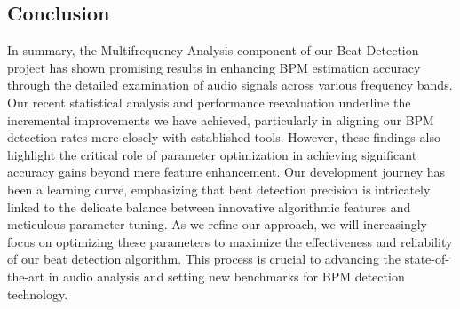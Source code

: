 \subsection{Conclusion}
In summary, the Multifrequency Analysis component of our Beat Detection project has shown promising results in enhancing BPM estimation accuracy through the detailed examination of audio signals across various frequency bands. Our recent statistical analysis and performance reevaluation underline the incremental improvements we have achieved, particularly in aligning our BPM detection rates more closely with established tools. However, these findings also highlight the critical role of parameter optimization in achieving significant accuracy gains beyond mere feature enhancement. Our development journey has been a learning curve, emphasizing that beat detection precision is intricately linked to the delicate balance between innovative algorithmic features and meticulous parameter tuning. As we refine our approach, we will increasingly focus on optimizing these parameters to maximize the effectiveness and reliability of our beat detection algorithm. This process is crucial to advancing the state-of-the-art in audio analysis and setting new benchmarks for BPM detection technology.
